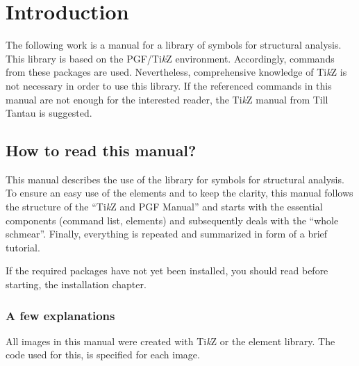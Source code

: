 \documentclass[%
  a4paper,
  BCOR20mm,
  pointlessnumbers,
  twoside,
  halfparskip,
  openright,
]{scrreprt}
\newcommand{\tikzsym}{Ti\emph{k}Z }
\begin{document}

\chapter{Introduction}
\label{chap:einleitung}

The following work is a manual for a library of symbols for structural analysis. This library is based on the PGF/\tikzsym environment. Accordingly, commands from these packages are used. Nevertheless, comprehensive knowledge of \tikzsym is not necessary in order to use this library. If the referenced commands in this manual are not enough for the interested reader, the \tikzsym manual from Till Tantau is suggested.



\section{How to read this manual?}

This manual describes the use of the library for symbols for structural analysis. To ensure an easy use of the elements and to keep the clarity, this manual follows the structure of the ``\tikzsym and PGF Manual'' and starts with the essential components (command list, elements) and subsequently deals with the ``whole schmear''. Finally, everything is repeated and summarized in form of a brief tutorial.  

If the required packages have not yet been installed, you should read before starting, the installation chapter.

\subsection{A few explanations} All images in this manual were created with
\tikzsym or the element library. The code used for this, is specified for each
image.
\end{document}
